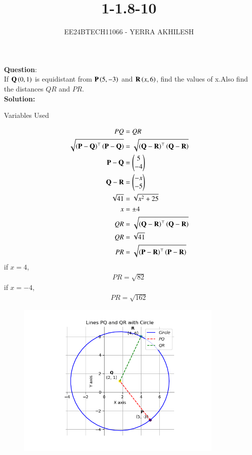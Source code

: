 \documentclass[journal]{IEEEtran}
\begin{document}

\vspace{3cm}

\title{1-1.8-10}
\author{EE24BTECH11066 - YERRA AKHILESH
}
{\let\newpage\relax\maketitle}

\renewcommand{\thefigure}{\theenumi}
\renewcommand{\thetable}{\theenumi}
\setlength{\intextsep}{10pt} %


\renewcommand{\thetable}{\theenumi}
\textbf{Question}:\\
If $\mathbf{Q}\left(0, 1\right)$ is equidistant from $\mathbf{P}\left(5, -3\right)$ and $\mathbf{R}\left(x, 6\right)$, find the values of x.Also find the distances $QR$ and $PR$.
\\
\textbf{Solution: }
\begin{table}[h!]    
  \centering
  
  \caption{Variables Used}
  \label{tab1-1.8-10}
\end{table}
\begin{align}
     PQ &= QR\\
    \sqrt{\left(\mathbf{P}-\mathbf{Q}\right)^\top\left(\mathbf{P}-\mathbf{Q}\right)} &= \sqrt{\left(\mathbf{Q}-\mathbf{R}\right)^\top\left(\mathbf{Q}-\mathbf{R}\right)}\\
    \mathbf{P}-\mathbf{Q}&=\begin{pmatrix}5\\-4\end{pmatrix}\\
    \mathbf{Q}-\mathbf{R}&=\begin{pmatrix}-x\\-5\end{pmatrix}\\
    \sqrt{41}&=\sqrt{x^2+25}\\
    x&=\pm{4}\\
    QR&=\sqrt{\left(\mathbf{Q}-\mathbf{R}\right)^\top\left(\mathbf{Q}-\mathbf{R}\right)}\\
    QR&=\sqrt{41}\\
    PR&=\sqrt{\left(\mathbf{P}-\mathbf{R}\right)^\top\left(\mathbf{P}-\mathbf{R}\right)}
\end{align}    
if $x=4$,
\begin{align}
    PR=\sqrt{82}
\end{align}    
if $x=-4$,
\begin{align}
    PR=\sqrt{162}
\end{align}
\begin{figure}[htp]
    \centering
    \includegraphics[width=10cm]{figs/Figure_1.png}
    \label{Point Q is Equidistant from P and R}
\end{figure}
\end{document}
